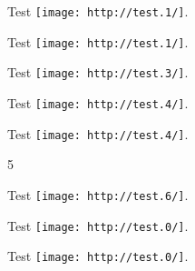 
\def\mytitle{Reference Images}


Test \texttt{[image: http://test.1/]}.

Test \texttt{[image: http://test.1/]}.

Test \texttt{[image: http://test.3/]}.

Test \texttt{[image: http://test.4/]}.

Test \texttt{[image: http://test.4/]}.

5

Test \texttt{[image: http://test.6/]}.

Test \texttt{[image: http://test.0/]}.

Test \texttt{[image: http://test.0/]}.



